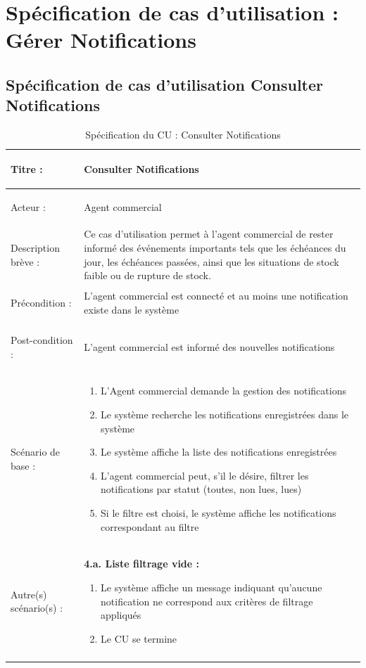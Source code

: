 \newpage
{}
\section{Spécification de cas d'utilisation : Gérer Notifications}

\subsection{Spécification de cas d'utilisation Consulter Notifications}

\begin{longtable}{|>{\bfseries\raggedright\arraybackslash}p{3.5cm}|p{\dimexpr\textwidth-3.5cm-4\tabcolsep-2\arrayrulewidth}|}
\hline
Titre : & Consulter Notifications \\
\hline
Acteur : & Agent commercial \\
\hline
Description brève : & Ce cas d'utilisation permet à l'agent commercial de rester informé des événements importants tels que les échéances du jour, les échéances passées, ainsi que les situations de stock faible ou de rupture de stock. \\
\hline
Précondition : & L'agent commercial est connecté et au moins une notification existe dans le système \\
\hline
Post-condition : & L'agent commercial est informé des nouvelles notifications \\
\hline
Scénario de base : &
\begin{enumerate}[leftmargin=1.5em, topsep=2pt, itemsep=1pt]
  \item L'Agent commercial demande la gestion des notifications
  \item Le système recherche les notifications enregistrées dans le système
  \item Le système affiche la liste des notifications enregistrées
  \item L'agent commercial peut, s'il le désire, filtrer les notifications par statut (toutes, non lues, lues)
  \item Si le filtre est choisi, le système affiche les notifications correspondant au filtre
\end{enumerate} \\
\hline
Autre(s) scénario(s) : &
\textbf{4.a. Liste filtrage vide :}
\begin{enumerate}[leftmargin=1.5em, topsep=2pt, itemsep=1pt]
  \item Le système affiche un message indiquant qu'aucune notification ne correspond aux critères de filtrage appliqués
  \item Le CU se termine
\end{enumerate} \\
\hline
\caption{Spécification du CU : Consulter Notifications}
\label{tab:cu-consulter-notifications}
\end{longtable}


